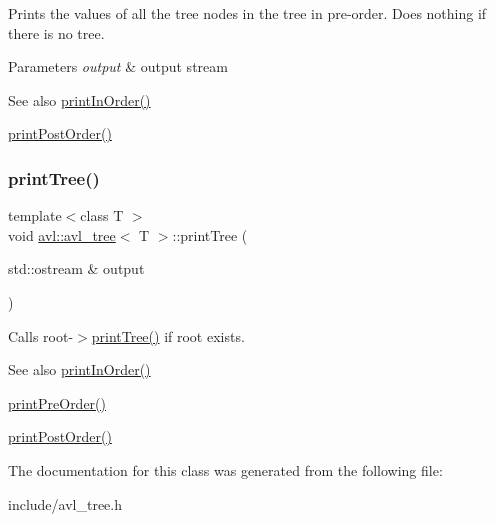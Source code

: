 Prints the values of all the tree nodes in the tree in pre-\/order. Does nothing if there is no tree. 
\begin{DoxyParams}{Parameters}
{\em output} & output stream \\
\hline
\end{DoxyParams}
\begin{DoxySeeAlso}{See also}
\hyperlink{classavl_1_1avl__tree_a335e8aec1bb894fb4140a1a05a77a271}{print\+In\+Order()} 

\hyperlink{classavl_1_1avl__tree_a852ff0f37be72373547888050e92eb4d}{print\+Post\+Order()} 
\end{DoxySeeAlso}
\mbox{\label{classavl_1_1avl__tree_a8d1c8a29e5c0f1a2830e0e35b4a6c4ee}} 
\subsubsection{\texorpdfstring{print\+Tree()}{printTree()}}
{\footnotesize\ttfamily template$<$class T $>$ \\
void \hyperlink{classavl_1_1avl__tree}{avl\+::avl\+\_\+tree}$<$ T $>$\+::print\+Tree (\begin{DoxyParamCaption}\item[{std\+::ostream \&}]{output }\end{DoxyParamCaption})\hspace{0.3cm}{\ttfamily [inline]}}

Calls root-\/$>$\hyperlink{classavl_1_1avl__tree_a8d1c8a29e5c0f1a2830e0e35b4a6c4ee}{print\+Tree()} if root exists. \begin{DoxySeeAlso}{See also}
\hyperlink{classavl_1_1avl__tree_a335e8aec1bb894fb4140a1a05a77a271}{print\+In\+Order()} 

\hyperlink{classavl_1_1avl__tree_afee4a12bb06b3a9ccdf63ace4201ef41}{print\+Pre\+Order()} 

\hyperlink{classavl_1_1avl__tree_a852ff0f37be72373547888050e92eb4d}{print\+Post\+Order()} 
\end{DoxySeeAlso}


The documentation for this class was generated from the following file\+:\begin{DoxyCompactItemize}
\item 
include/avl\+\_\+tree.\+h\end{DoxyCompactItemize}

